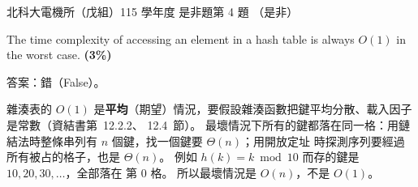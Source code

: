 \begin{pastexam}[label={px:ntut-115-ee-ds-04}]{北科大電機所（戊組）115 學年度 是非題第 4 題}
（是非）

The time complexity of accessing an element in a hash table is always $O(1)$ in the worst case.
\textbf{(3\%)}
\end{pastexam}

\begin{pastsoln}
答案：錯（False）。

雜湊表的 $O(1)$ 是\textbf{平均}（期望）情況，要假設雜湊函數把鍵平均分散、載入因子是常數（資結書第~12.2.2、
12.4~節）。 最壞情況下所有的鍵都落在同一格：用鏈結法時整條串列有 $n$ 個鍵，找一個鍵要 $\Theta(n)$；用開放定址
時探測序列要經過所有被占的格子，也是 $\Theta(n)$。 例如 $h(k) = k \bmod 10$ 而存的鍵是 $10, 20, 30, \ldots$，全部落在
第 $0$ 格。 所以最壞情況是 $O(n)$，不是 $O(1)$。
\end{pastsoln}
